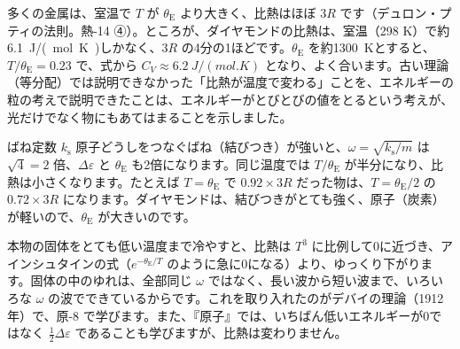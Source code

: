 \begin{bkfigure}
\label{ph:熱-15:fig-einstein}
\end{bkfigure}
多くの金属は、室温で $T$ が $\theta_{\mathrm E}$ より大きく、比熱はほぼ $3R$ です（デュロン・プティの法則。熱-14 ④）。ところが、ダイヤモンドの比熱は、室温（298 K）で約\qty{6.1}{J/(mol.K)}しかなく、$3R$ の4分の1ほどです。$\theta_{\mathrm E}$ を約\qty{1300}{K}とすると、$T/\theta_{\mathrm E}=0.23$ で、式から $C_V\approx\qty{6.2}{J/(mol.K)}$ となり、よく合います。古い理論（等分配）では説明できなかった「比熱が温度で変わる」ことを、エネルギーの粒の考えで説明できたことは、エネルギーがとびとびの値をとるという考えが、光だけでなく物にもあてはまることを示しました。

\begin{phbaisuru}[4倍]{ばね定数 $k_{\mathrm s}$}
原子どうしをつなぐばね（結びつき）が強いと、$\omega=\sqrt{k_{\mathrm s}/m}$ は $\sqrt4=2$ 倍、$\Delta\varepsilon$ と $\theta_{\mathrm E}$ も2倍になります。同じ温度では $T/\theta_{\mathrm E}$ が半分になり、比熱は小さくなります。たとえば $T=\theta_{\mathrm E}$ で $0.92\times3R$ だった物は、$T=\theta_{\mathrm E}/2$ の $0.72\times3R$ になります。ダイヤモンドは、結びつきがとても強く、原子（炭素）が軽いので、$\theta_{\mathrm E}$ が大きいのです。
\end{phbaisuru}

\begin{seikaku}
本物の固体をとても低い温度まで冷やすと、比熱は $T^3$ に比例して0に近づき、アインシュタインの式（$e^{-\theta_{\mathrm E}/T}$ のように急に0になる）より、ゆっくり下がります。固体の中のゆれは、全部同じ $\omega$ ではなく、長い波から短い波まで、いろいろな $\omega$ の波でできているからです。これを取り入れたのがデバイの理論（1912年）で、原-8 で学びます。また、『原子』では、いちばん低いエネルギーが0ではなく $\tfrac{1}{2}\Delta\varepsilon$ であることも学びますが、比熱は変わりません。
\end{seikaku}

